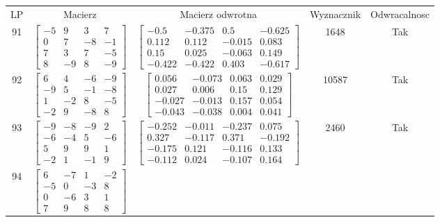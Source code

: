 \documentclass[a4paper,12pt]{article}
\begin{document}
\bgroup {} \vspace{0.2in} \begin{tabular}{c c c c c}
LP & Macierz & Macierz odwrotna & Wyznacznik & Odwracalnosc\\
91
&
$\begin{bmatrix} -5 & 9 & 3 & 7 \\ 0 & 7 & -8 & -1 \\ 7 & 3 & 7 & -5 \\ 8 & -9 & 8 & -9 \end{bmatrix}$
&
$\begin{bmatrix} -0.5 & -0.375 & 0.5 & -0.625 \\ 0.112 & 0.112 & -0.015 & 0.083 \\ 0.15 & 0.025 & -0.063 & 0.149 \\ -0.422 & -0.422 & 0.403 & -0.617 \end{bmatrix}$
&
1648
&
Tak
\\
92
&
$\begin{bmatrix} 6 & 4 & -6 & -9 \\ -9 & 5 & -1 & -8 \\ 1 & -2 & 8 & -5 \\ -2 & 9 & -8 & 8 \end{bmatrix}$
&
$\begin{bmatrix} 0.056 & -0.073 & 0.063 & 0.029 \\ 0.027 & 0.006 & 0.15 & 0.129 \\ -0.027 & -0.013 & 0.157 & 0.054 \\ -0.043 & -0.038 & 0.004 & 0.041 \end{bmatrix}$
&
10587
&
Tak
\\
93
&
$\begin{bmatrix} -9 & -8 & -9 & 2 \\ -6 & -4 & 5 & -6 \\ 5 & 9 & 9 & 1 \\ -2 & 1 & -1 & 9 \end{bmatrix}$
&
$\begin{bmatrix} -0.252 & -0.011 & -0.237 & 0.075 \\ 0.327 & -0.117 & 0.371 & -0.192 \\ -0.175 & 0.121 & -0.116 & 0.133 \\ -0.112 & 0.024 & -0.107 & 0.164 \end{bmatrix}$
&
2460
&
Tak
\\
94
&
$\begin{bmatrix} 6 & -7 & 1 & -2 \\ -5 & 0 & -3 & 8 \\ 0 & -6 & 3 & 1 \\ 7 & 9 & 8 & 8 \end{bmatrix}$

\end{tabular}
\end{document}
